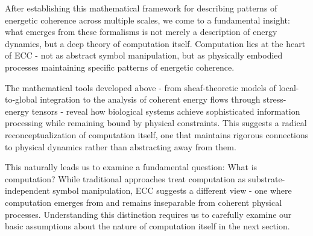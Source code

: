After establishing this mathematical framework for describing patterns of energetic coherence across multiple scales, we come to a fundamental insight: what emerges from these formalisms is not merely a description of energy dynamics, but a deep theory of computation itself. Computation lies at the heart of ECC - not as abstract symbol manipulation, but as physically embodied processes maintaining specific patterns of energetic coherence.

The mathematical tools developed above - from sheaf-theoretic models of local-to-global integration to the analysis of coherent energy flows through stress-energy tensors - reveal how biological systems achieve sophisticated information processing while remaining bound by physical constraints. This suggests a radical reconceptualization of computation itself, one that maintains rigorous connections to physical dynamics rather than abstracting away from them.

This naturally leads us to examine a fundamental question: What is computation? While traditional approaches treat computation as substrate-independent symbol manipulation, ECC suggests a different view - one where computation emerges from and remains inseparable from coherent physical processes. Understanding this distinction requires us to carefully examine our basic assumptions about the nature of computation itself in the next section.